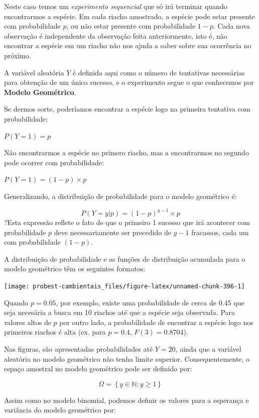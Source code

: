 \documentclass[
]{book}
\begin{document}
Neste caso temos um \emph{experimento sequencial} que só irá terminar quando encontrarmos a espécie. Em cada riacho amostrado, a espécie pode estar presente com probabilidade \(p\), ou não estar presente com probabilidade \(1-p\). Cada nova observação é independente da observação feita anteriormente, isto é, não encontrar a espécie em um riacho não nos ajuda a saber sobre sua ocorrência no próximo.

A variável aleatória \(Y\) é definida aqui como o número de tentativas necessárias para obtenção de um único sucesso, e o experimento segue o que conhecemos por \textbf{Modelo Geométrico}.

Se dermos sorte, poderíamos encontrar a espécie logo na primeira tentativa com probabilidade:

\(P(Y = 1) = p\)

Não encontrarmos a espécie no primero riacho, mas a encontrarmos no segundo pode ocorrer com probabilidade:

\(P(Y = 1) = (1-p) \times p\)

Generalizando, a distribuição de probabilidade para o modelo geométrico é:

\[P(Y = y|p) = (1-p)^{y-1} \times p\]
?Esta expressão reflete o fato de que o primeiro 1 sucesso que irá acontecer com probabilidade \(p\) deve necessariamente ser precedido de \(y-1\) fracassos, cada um com probabilidade \((1-p)\).

A distribuição de probabilidade e as funções de distribuição acumulada para o modelo geométrico têm os seguintes formatos:

\begin{center}\texttt{[image: probest-cambientais\_files/figure-latex/unnamed-chunk-396-1]} \end{center}

Quando \(p = 0.05\), por exemplo, existe uma probabilidade de cerca de 0.45 que seja necesária a busca em 10 riachos até que a espécie seja observada. Para valores altos de \(p\) por outro lado, a probabilidade de encontrar a espécie logo nos primeiros riachos é alta (ex. para \(p = 0.4\), \(F(3) = 0.8704\)).

Nas figuras, são apresentadas probabilidades até \(Y = 20\), ainda que a variável aleatória no modelo geométrico não tenha limite superior. Consequentemente, o espaço amostral no modelo geométrico pode ser definido por:

\[\Omega = \left\{ y \in \mathbb{N}: y \ge 1 \right\}\]

Assim como no modelo binomial, podemos definir os valores para a esperança e variância do modelo geométrico por:
\end{document}
